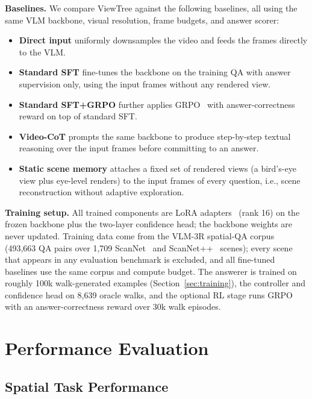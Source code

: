 \documentclass[sigconf,10pt]{acmart}
\begin{document}
\noindent\textbf{Baselines.} We compare ViewTree against the following baselines, all using the same VLM backbone, visual resolution, frame budgets, and answer scorer:
\begin{itemize}
    \item \textbf{Direct input} uniformly downsamples the video and feeds the frames directly to the VLM.
    \item \textbf{Standard SFT} fine-tunes the backbone on the training QA with answer supervision only, using the input frames without any rendered view.
    \item \textbf{Standard SFT+GRPO} further applies GRPO~\cite{deepseekmath2024} with answer-correctness reward on top of standard SFT.
    \item \textbf{Video-CoT} prompts the same backbone to produce step-by-step textual reasoning over the input frames before committing to an answer.
    \item \textbf{Static scene memory} attaches a fixed set of rendered views (a bird's-eye view plus eye-level renders) to the input frames of every question, i.e., scene reconstruction without adaptive exploration.
\end{itemize}


\noindent\textbf{Training setup.} All trained components are LoRA adapters~\cite{hu2022lora} (rank 16) on the frozen backbone plus the two-layer confidence head; the backbone weights are never updated. Training data come from the VLM-3R spatial-QA corpus~\cite{vstibench2026} (493{,}663 QA pairs over 1{,}709 ScanNet~\cite{dai2017scannet} and ScanNet++~\cite{yeshwanth2023scannetpp} scenes); every scene that appears in any evaluation benchmark is excluded, and all fine-tuned baselines use the same corpus and compute budget. The answerer is trained on roughly 100k walk-generated examples (Section~\ref{sec:training}), the controller and confidence head on 8{,}639 oracle walks, and the optional RL stage runs GRPO with an answer-correctness reward over 30k walk episodes.

\section{Performance Evaluation}
\label{sec:evaluation}

\subsection{Spatial Task Performance}
\label{sec:main_results}
\end{document}
